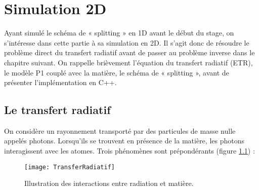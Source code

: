 
\chapter{Simulation 2D} %

\label{Chapter3} %


Ayant simulé le schéma de « splitting » en 1D avant le début du stage, on s'intéresse dans cette partie à sa simulation en 2D. Il s'agit donc de résoudre le problème direct du transfert radiatif avant de passer au problème inverse dans le chapitre suivant. On rappelle brièvement l'équation du transfert radiatif (ETR), le modèle P1 couplé avec la matière, le schéma de « splitting », avant de présenter l'implémentation en C++.

\section{Le transfert radiatif}

On considère un rayonnement transporté par des particules de masse nulle appelés photons. Lorsqu'ils se trouvent en présence de la matière, les photons interagissent avec les atomes. Trois phénomènes sont prépondérants (figure \ref{fig:TransferRadiatif}) :

\begin{figure}[!h]
\centering
\texttt{[image: TransferRadiatif]} 
\decoRule
\caption[TransferRadiatif]{Illustration des interactions entre radiation et matière.}
\label{fig:TransferRadiatif}
\end{figure}

